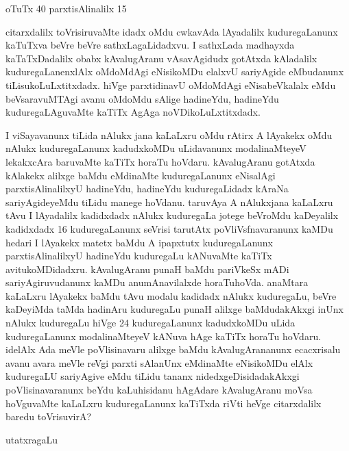 \begin{enumerate}[\rm 1)]
\begin{center}
oTuTx {\rm 40} parxtisAlinalilx {\rm 15} 
\end{center}

citarxdalilx toVrisiruvaMte idadx oMdu cwkavAda lAyadalilx kuduregaLanunx kaTuTxva beVre beVre sathxLagaLidadxvu. I sathxLada madhayxda kaTaTxDadalilx obabx kAvalugAranu vAsavAgidudx gotAtxda kAladalilx kuduregaLanenxlAlx oMdoMdAgi eNisikoMDu elalxvU sariyAgide eMbudanunx tiLisukoLuLxtitxdadx. hiVge parxtidinavU oMdoMdAgi eNisabeVkalalx eMdu beVsaravuMTAgi avanu oMdoMdu sAlige hadineYdu, hadineYdu kuduregaLAguvaMte kaTiTx AgAga noVDikoLuLxtitxdadx.

I viSayavanunx tiLida nAlukx jana kaLaLxru oMdu rAtirx A lAyakekx oMdu nAlukx kuduregaLanunx kadudxkoMDu uLidavanunx modalinaMteyeV lekakxcAra baruvaMte kaTiTx horaTu hoVdaru. kAvalugAranu gotAtxda kAlakekx alilxge baMdu eMdinaMte kuduregaLanunx eNisalAgi parxtisAlinalilxyU hadineYdu, hadineYdu kuduregaLidadx kAraNa sariyAgideyeMdu tiLidu manege hoVdanu. taruvAya A nAlukxjana kaLaLxru tAvu I lAyadalilx kadidxdadx nAlukx kuduregaLa jotege beVroMdu kaDeyalilx kadidxdadx {\rm 16} kuduregaLanunx seVrisi tarutAtx poVliVsfnavaranunx kaMDu hedari I lAyakekx matetx baMdu A ipapxtutx kuduregaLanunx parxtisAlinalilxyU hadineYdu kuduregaLu kANuvaMte kaTiTx avitukoMDidadxru. kAvalugAranu punaH baMdu pariVkeSx mADi sariyAgiruvudanunx kaMDu anumAnavilalxde horaTuhoVda. anaMtara kaLaLxru lAyakekx baMdu tAvu modalu kadidadx nAlukx kuduregaLu, beVre kaDeyiMda taMda hadinAru kuduregaLu punaH alilxge baMdudakAkxgi inUnx nAlukx kuduregaLu hiVge {\rm 24} kuduregaLanunx kadudxkoMDu uLida kuduregaLanunx modalinaMteyeV kANuva hAge kaTiTx horaTu hoVdaru. idelAlx Ada meVle poVlisinavaru alilxge baMdu kAvalugArananunx ecacxrisalu avanu avara meVle reVgi parxti sAlanUnx eMdinaMte eNisikoMDu elAlx kuduregaLU sariyAgive eMdu tiLidu tananx nidedxgeDisidadakAkxgi poVlisinavaranunx beYdu kaLuhisidanu hAgAdare kAvalugAranu moVsa hoVguvaMte kaLaLxru kuduregaLanunx kaTiTxda riVti heVge citarxdalilx baredu toVrisuvirA?
\begin{center}
utatxragaLu


\end{center}
\end{enumerate}

